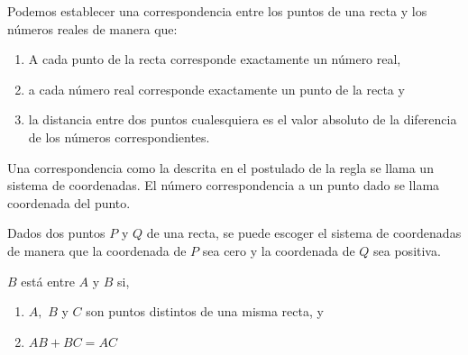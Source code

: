 \begin{tcolorbox}[colback=black!9!,colframe=white]
\begin{post} Podemos establecer una correspondencia entre los puntos de una recta y los números reales de manera que:
\begin{enumerate}[\bfseries a)]
\item A cada punto de la recta corresponde exactamente un número real,
\item a cada número real corresponde exactamente un punto de la recta y
\item la distancia entre dos puntos cualesquiera es el valor absoluto de la diferencia de los números correspondientes.\\
\end{enumerate}
\end{post}
\end{tcolorbox}

\begin{tcolorbox}[colback=black!3!,colframe=white]
\begin{def.}
Una correspondencia como la descrita en el postulado de la regla se llama un sistema de coordenadas. El número correspondencia a un punto dado se llama coordenada del punto.
\end{def.}
\end{tcolorbox}

\begin{tcolorbox}[colback=black!9!,colframe=white]
\begin{post}
Dados dos puntos $P$ y $Q$ de una recta, se puede escoger el sistema de coordenadas de manera que la coordenada de $P$ sea cero y la coordenada de $Q$ sea positiva.\\
\end{post}
\end{tcolorbox}

\begin{tcolorbox}[colback=black!3!, colframe=white]
\begin{def.} $B$ está entre $A$ y $B$ si,
\begin{enumerate}[\bfseries i)]
\item $A,$ $B$ y $C$ son puntos distintos de una misma recta, y
\item $AB + BC = AC$\\
\end{enumerate}
\end{def.}
\end{tcolorbox}

